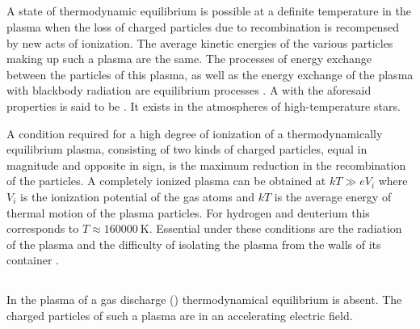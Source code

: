 \subsection{}\label{22.6.5} A state of thermodynamic equilibrium is possible at a definite temperature in the plasma when the loss of charged particles due to recombination  is recompensed by new acts of ionization. The average kinetic energies of the various particles making up such a plasma are the same. The processes of energy exchange between the particles of this plasma, as well as the energy exchange of the plasma with blackbody radiation  are equilibrium processes . A  with the aforesaid properties is said to be . It exists in the atmospheres of high-temperature stars.

A condition required for a high degree of ionization of a thermodynamically equilibrium plasma, consisting of two kinds of charged particles, equal in magnitude and opposite in sign, is the maximum reduction in the recombination  of the particles. A completely ionized plasma can be obtained at $kT \gg eV_{i}$ where $V_{i}$ is the ionization potential  of the gas atoms and $kT$ is the average energy of thermal motion of the plasma particles. For hydrogen and deuterium this corresponds to $T \approx  \SI{160000}{\kelvin}$. Essential under these conditions are the radiation of the plasma and the difficulty of isolating the plasma from the walls of its container .

\subsection{}\label{22.6.6} In the plasma of a gas discharge  () thermodynamical equilibrium  is absent. The charged particles of such a plasma are in an accelerating electric field.

